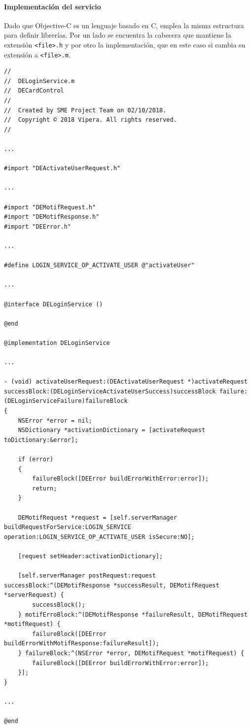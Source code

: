 \documentclass[a4paper, 12pt]{article}
\newenvironment{code}{\captionsetup{type=listing}}{}
\begin{document}
\paragraph{Implementación del servicio}
\label{sec-4-2-3-2}
Dado que Objective-C es un lenguaje basado en C, emplea la misma estructura para definir librerías. Por un lado se encuentra la cabecera que mantiene
la extensión \verb~<file>.h~ y por otro la implementación, que en este caso si cambia su extensión a \verb~<file>.m~.
\begin{code}
\label{code:ios-implementation}
\begin{verbatim}
//
//  DELoginService.m
//  DECardControl
//
//  Created by SME Project Team on 02/10/2018.
//  Copyright © 2018 Vipera. All rights reserved.
//

...

#import "DEActivateUserRequest.h"

...

#import "DEMotifRequest.h"
#import "DEMotifResponse.h"
#import "DEError.h"

...

#define LOGIN_SERVICE_OP_ACTIVATE_USER @"activateUser"

...

@interface DELoginService ()

@end

@implementation DELoginService

...

- (void) activateUserRequest:(DEActivateUserRequest *)activateRequest successBlock:(DELoginServiceActivateUserSuccess)successBlock failure:(DELoginServiceFailure)failureBlock
{
    NSError *error = nil;
    NSDictionary *activationDictionary = [activateRequest toDictionary:&error];

    if (error)
    {
        failureBlock([DEError buildErrorWithError:error]);
        return;
    }

    DEMotifRequest *request = [self.serverManager buildRequestForService:LOGIN_SERVICE operation:LOGIN_SERVICE_OP_ACTIVATE_USER isSecure:NO];

    [request setHeader:activationDictionary];

    [self.serverManager postRequest:request successBlock:^(DEMotifResponse *successResult, DEMotifRequest *serverRequest) {
        successBlock();
    } motifErroBlock:^(DEMotifResponse *failureResult, DEMotifRequest *motifRequest) {
        failureBlock([DEError buildErrorWithMotifResponse:failureResult]);
    } failureBlock:^(NSError *error, DEMotifRequest *motifRequest) {
        failureBlock([DEError buildErrorWithError:error]);
    }];
}

...

@end

\end{verbatim}
\end{code}
\end{document}

